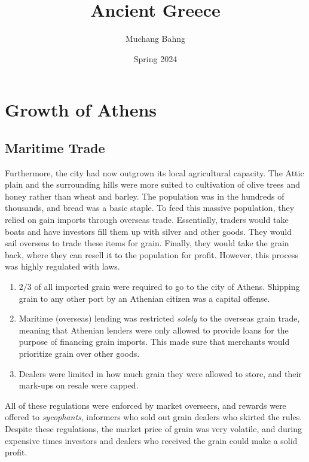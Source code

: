 \documentclass{article}
\begin{document}
\title{Ancient Greece}
\author{Muchang Bahng}
\date{Spring 2024}

\maketitle
\tableofcontents
\pagebreak

\section{Growth of Athens}

  \subsection{Maritime Trade}

    Furthermore, the city had now outgrown its local agricultural capacity. The Attic plain and the surrounding hills were more suited to cultivation of olive trees and honey rather than wheat and barley. The population was in the hundreds of thousands, and bread was a basic staple. To feed this massive population, they relied on gain imports through overseas trade. Essentially, traders would take boats and have investors fill them up with silver and other goods. They would sail overseas to trade these items for grain. Finally, they would take the grain back, where they can resell it to the population for profit. However, this process was highly regulated with laws.  
    \begin{enumerate}
      \item $2/3$ of all imported grain were required to go to the city of Athens. Shipping grain to any other port by an Athenian citizen was a capital offense. 
      \item Maritime (overseas) lending was restricted \textit{solely} to the overseas grain trade, meaning that Athenian lenders were only allowed to provide loans for the purpose of financing grain imports. This made sure that merchants would prioritize grain over other goods. 
      \item Dealers were limited in how much grain they were allowed to store, and their mark-ups on resale were capped.  
    \end{enumerate}
    All of these regulations were enforced by market overseers, and rewards were offered to \textit{sycophants}, informers who sold out grain dealers who skirted the rules. Despite these regulations, the market price of grain was very volatile, and during expensive times investors and dealers who received the grain could make a solid profit. 
\end{document}
